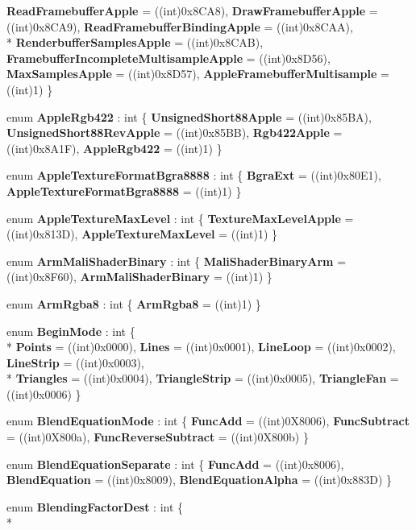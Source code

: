 \begin{DoxyCompactItemize}
{\bfseries Read\-Framebuffer\-Apple} = ((int)0x8\-C\-A8), 
{\bfseries Draw\-Framebuffer\-Apple} = ((int)0x8\-C\-A9), 
{\bfseries Read\-Framebuffer\-Binding\-Apple} = ((int)0x8\-C\-A\-A), 
\\*
{\bfseries Renderbuffer\-Samples\-Apple} = ((int)0x8\-C\-A\-B), 
{\bfseries Framebuffer\-Incomplete\-Multisample\-Apple} = ((int)0x8\-D56), 
{\bfseries Max\-Samples\-Apple} = ((int)0x8\-D57), 
{\bfseries Apple\-Framebuffer\-Multisample} = ((int)1)
 \}
\item 
enum {\bfseries Apple\-Rgb422} \-: int \{ {\bfseries Unsigned\-Short88\-Apple} = ((int)0x85\-B\-A), 
{\bfseries Unsigned\-Short88\-Rev\-Apple} = ((int)0x85\-B\-B), 
{\bfseries Rgb422\-Apple} = ((int)0x8\-A1\-F), 
{\bfseries Apple\-Rgb422} = ((int)1)
 \}
\item 
enum {\bfseries Apple\-Texture\-Format\-Bgra8888} \-: int \{ {\bfseries Bgra\-Ext} = ((int)0x80\-E1), 
{\bfseries Apple\-Texture\-Format\-Bgra8888} = ((int)1)
 \}
\item 
enum {\bfseries Apple\-Texture\-Max\-Level} \-: int \{ {\bfseries Texture\-Max\-Level\-Apple} = ((int)0x813\-D), 
{\bfseries Apple\-Texture\-Max\-Level} = ((int)1)
 \}
\item 
enum {\bfseries Arm\-Mali\-Shader\-Binary} \-: int \{ {\bfseries Mali\-Shader\-Binary\-Arm} = ((int)0x8\-F60), 
{\bfseries Arm\-Mali\-Shader\-Binary} = ((int)1)
 \}
\item 
enum {\bfseries Arm\-Rgba8} \-: int \{ {\bfseries Arm\-Rgba8} = ((int)1)
 \}
\item 
enum {\bfseries Begin\-Mode} \-: int \{ \\*
{\bfseries Points} = ((int)0x0000), 
{\bfseries Lines} = ((int)0x0001), 
{\bfseries Line\-Loop} = ((int)0x0002), 
{\bfseries Line\-Strip} = ((int)0x0003), 
\\*
{\bfseries Triangles} = ((int)0x0004), 
{\bfseries Triangle\-Strip} = ((int)0x0005), 
{\bfseries Triangle\-Fan} = ((int)0x0006)
 \}
\item 
enum {\bfseries Blend\-Equation\-Mode} \-: int \{ {\bfseries Func\-Add} = ((int)0\-X8006), 
{\bfseries Func\-Subtract} = ((int)0\-X800a), 
{\bfseries Func\-Reverse\-Subtract} = ((int)0\-X800b)
 \}
\item 
enum {\bfseries Blend\-Equation\-Separate} \-: int \{ {\bfseries Func\-Add} = ((int)0x8006), 
{\bfseries Blend\-Equation} = ((int)0x8009), 
{\bfseries Blend\-Equation\-Alpha} = ((int)0x883\-D)
 \}
\item 
enum {\bfseries Blending\-Factor\-Dest} \-: int \{ \\*

\end{DoxyCompactItemize}
